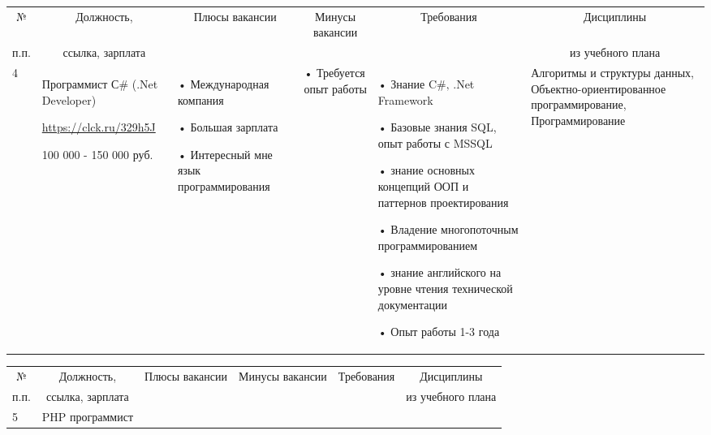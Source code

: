 \documentclass[14pt]{extreport}
\begin{document}
\begin{landscape}
\begin{table}[H]
	\begin{center}
		\begin{small}
		\begin{tabular}{|p{0.1cm}|p{5cm}|p{4.5cm}|p{4.5cm}|p{4cm}|p{3cm}|} \hline
			\multicolumn{1}{|c|}{№}&\multicolumn{1}{c|}{Должность,}&\multicolumn{1}{c|}{Плюсы вакансии}&\multicolumn{1}{c|}{Минусы вакансии}&\multicolumn{1}{c|}{Требования}&\multicolumn{1}{c|}{Дисциплины}\\ 
			\multicolumn{1}{|c|}{п.п.}&\multicolumn{1}{c|}{ссылка, зарплата}&\multicolumn{1}{c|}{}&\multicolumn{1}{c|}{}&\multicolumn{1}{c|}{}&\multicolumn{1}{c|}{из учебного плана}\\ 
			\hline		
				4 & Программист С\# (.Net Developer)
				
				\url{https://clck.ru/329h5J}
				
				100 000 - 150 000 руб. &
				• Международная компания
				
				• Большая зарплата
				
				• Интересный мне язык программирования
				&
				• Требуется опыт работы
				&
				• Знание C\#‚ .Net Framework
				 
				• Базовые знания SQL, опыт работы с MSSQL
				
				• знание основных концепций ООП и паттернов проектирования
				
				• Владение многопоточным программированием
				
				• знание английского на уровне чтения технической документации
				
				• Опыт работы 1-3 года 
				&
				Алгоритмы и структуры данных, Объектно-ориентированное программирование, Программирование
				\\
				\hline
			\end{tabular}
		\end{small}
	\end{center}
\end{table}
\begin{table}[H]
	\begin{center}
		\begin{small}
		\begin{tabular}{|p{0.1cm}|p{5cm}|p{4.5cm}|p{4.5cm}|p{4cm}|p{3cm}|} \hline
			\multicolumn{1}{|c|}{№}&\multicolumn{1}{c|}{Должность,}&\multicolumn{1}{c|}{Плюсы вакансии}&\multicolumn{1}{c|}{Минусы вакансии}&\multicolumn{1}{c|}{Требования}&\multicolumn{1}{c|}{Дисциплины}\\ 
			\multicolumn{1}{|c|}{п.п.}&\multicolumn{1}{c|}{ссылка, зарплата}&\multicolumn{1}{c|}{}&\multicolumn{1}{c|}{}&\multicolumn{1}{c|}{}&\multicolumn{1}{c|}{из учебного плана}\\ 
			\hline	
			5 & PHP программист
				

\end{tabular}
\end{small}
\end{center}
\end{table}
\end{landscape}
\end{document}
